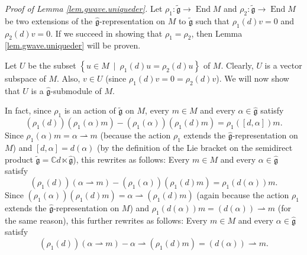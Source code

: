 \documentclass[etingof-lie.tex]{subfiles}
\begin{document}
\textit{Proof of Lemma \ref{lem.gwave.uniqueder}.} Let $\rho_{1}%
:\widetilde{\mathfrak{g}}\rightarrow\operatorname*{End}M$ and $\rho
_{2}:\widetilde{\mathfrak{g}}\rightarrow\operatorname*{End}M$ be two
extensions of the $\widehat{\mathfrak{g}}$-representation on $M$ to
$\widetilde{\mathfrak{g}}$ such that $\rho_{1}\left(  d\right)  v=0$ and
$\rho_{2}\left(  d\right)  v=0$. If we succeed in showing that $\rho_{1}%
=\rho_{2}$, then Lemma \ref{lem.gwave.uniqueder} will be proven.

Let $U$ be the subset $\left\{  u\in M\ \mid\ \rho_{1}\left(  d\right)
u=\rho_{2}\left(  d\right)  u\right\}  $ of $M$. Clearly, $U$ is a vector
subspace of $M$. Also, $v\in U$ (since $\rho_{1}\left(  d\right)  v=0=\rho
_{2}\left(  d\right)  v$). We will now show that $U$ is a
$\widehat{\mathfrak{g}}$-submodule of $M$.

In fact, since $\rho_{1}$ is an action of $\widetilde{\mathfrak{g}}$ on $M$,
every $m\in M$ and every $\alpha\in\widehat{\mathfrak{g}}$ satisfy%
\[
\left(  \rho_{1}\left(  d\right)  \right)  \left(  \rho_{1}\left(
\alpha\right)  m\right)  -\left(  \rho_{1}\left(  \alpha\right)  \right)
\left(  \rho_{1}\left(  d\right)  m\right)  =\rho_{1}\left(  \left[
d,\alpha\right]  \right)  m.
\]
Since $\rho_{1}\left(  \alpha\right)  m=\alpha\rightharpoonup m$ (because the
action $\rho_{1}$ extends the $\widehat{\mathfrak{g}}$-representation on $M$)
and $\left[  d,\alpha\right]  =d\left(  \alpha\right)  $ (by the definition of
the Lie bracket on the semidirect product $\widetilde{\mathfrak{g}}%
=\mathbb{C}d\ltimes\widehat{\mathfrak{g}}$), this rewrites as follows: Every
$m\in M$ and every $\alpha\in\widehat{\mathfrak{g}}$ satisfy%
\[
\left(  \rho_{1}\left(  d\right)  \right)  \left(  \alpha\rightharpoonup
m\right)  -\left(  \rho_{1}\left(  \alpha\right)  \right)  \left(  \rho
_{1}\left(  d\right)  m\right)  =\rho_{1}\left(  d\left(  \alpha\right)
\right)  m.
\]
Since $\left(  \rho_{1}\left(  \alpha\right)  \right)  \left(  \rho_{1}\left(
d\right)  m\right)  =\alpha\rightharpoonup\left(  \rho_{1}\left(  d\right)
m\right)  $ (again because the action $\rho_{1}$ extends the
$\widehat{\mathfrak{g}}$-representation on $M$) and $\rho_{1}\left(  d\left(
\alpha\right)  \right)  m=\left(  d\left(  \alpha\right)  \right)
\rightharpoonup m$ (for the same reason), this further rewrites as follows:
Every $m\in M$ and every $\alpha\in\widehat{\mathfrak{g}}$ satisfy%
\begin{equation}
\left(  \rho_{1}\left(  d\right)  \right)  \left(  \alpha\rightharpoonup
m\right)  -\alpha\rightharpoonup\left(  \rho_{1}\left(  d\right)  m\right)
=\left(  d\left(  \alpha\right)  \right)  \rightharpoonup m.
\label{pf.gwave.uniqueder.1}%
\end{equation}
\end{document}
